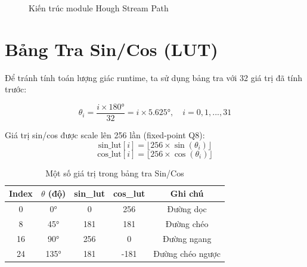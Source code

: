 \documentclass[12pt,a4paper]{report}
\begin{document}
\begin{figure}[H]
\caption{Kiến trúc module Hough Stream Path}
\label{fig:hough_arch}
\end{figure}

\section{Bảng Tra Sin/Cos (LUT)}

Để tránh tính toán lượng giác runtime, ta sử dụng bảng tra với 32 giá trị đã tính trước:

\begin{equation}
    \theta_i = \frac{i \times 180°}{32} = i \times 5.625°, \quad i = 0, 1, ..., 31
\end{equation}

Giá trị sin/cos được scale lên 256 lần (fixed-point Q8):
\begin{equation}
    \text{sin\_lut}[i] = \lfloor 256 \times \sin(\theta_i) \rfloor
\end{equation}
\begin{equation}
    \text{cos\_lut}[i] = \lfloor 256 \times \cos(\theta_i) \rfloor
\end{equation}

\begin{table}[H]
\centering
\caption{Một số giá trị trong bảng tra Sin/Cos}
\begin{tabular}{|c|c|c|c|c|}
\hline
\textbf{Index} & \textbf{$\theta$ (độ)} & \textbf{sin\_lut} & \textbf{cos\_lut} & \textbf{Ghi chú} \\
\hline
0 & 0° & 0 & 256 & Đường dọc \\
8 & 45° & 181 & 181 & Đường chéo \\
16 & 90° & 256 & 0 & Đường ngang \\
24 & 135° & 181 & -181 & Đường chéo ngược \\
\hline
\end{tabular}
\end{table}
\end{document}
